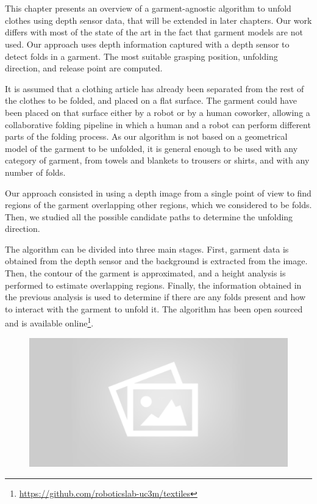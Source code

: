 \chapter{\MyTitle}
\label{architecture}

This chapter presents an overview of a garment-agnostic algorithm to unfold clothes using depth sensor data, that will be extended in later chapters. Our work differs with most of the state of the art in the fact that garment models are not used. Our approach uses depth information captured with a depth sensor to detect folds in a garment. The most suitable grasping position, unfolding direction, and release point are computed.

It is assumed that a clothing article has already been separated from the rest of the clothes to be folded, and placed on a flat surface. The garment could have been placed on that surface either by a robot or by a human coworker, allowing a collaborative folding pipeline in which a human and a robot can perform different parts of the folding process.
As our algorithm is not based on a geometrical model of the garment to be unfolded, it is general enough to be used with any category of garment, from towels and blankets to trousers or shirts, and with any number of folds. 

Our approach consisted in using a depth image from a single point of view to find regions of the garment overlapping other regions, which we considered to be folds. Then, we studied all the possible candidate paths to determine the unfolding direction. 

The algorithm can be divided into three main stages. First, garment data is obtained from the depth sensor and the background is extracted from the image. Then, the contour of the garment is approximated, and a height analysis is performed to estimate overlapping regions. Finally, the information obtained in the previous analysis is used to determine if there are any folds present and how to interact with the garment to unfold it. The algorithm has been open sourced and is available online\footnote{\url{https://github.com/roboticslab-uc3m/textiles}}.

\begin{figure}[thpb]
    \centering
    \includegraphics[width=0.8
    \textwidth]{figures/placeholder2.png}
    \caption{}
    \label{fig:pipeline_block_diagram}
\end{figure}

